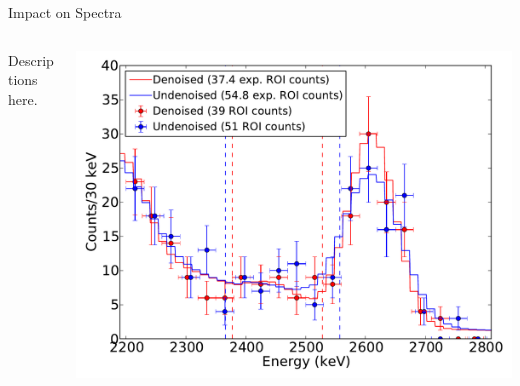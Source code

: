\documentclass[final]{beamer} %
\begin{document}
\begin{frame}{}
\begin{columns}[t]
\begin{column}{.3\linewidth}
\begin{block}{Impact on Spectra}
      \begin{columns}
        \begin{column}{0.37\textwidth}
          Descriptions here.
        \end{column}
        \begin{column}{0.63\textwidth}
          \includegraphics[keepaspectratio=true,width=\textwidth]{DenoisedVsUndenoised_TotalPdfsWithData.pdf}
        \end{column}
      \end{columns}
    \end{block}



  \end{column}


  \end{columns}
  \end{frame}
  
\end{document}
